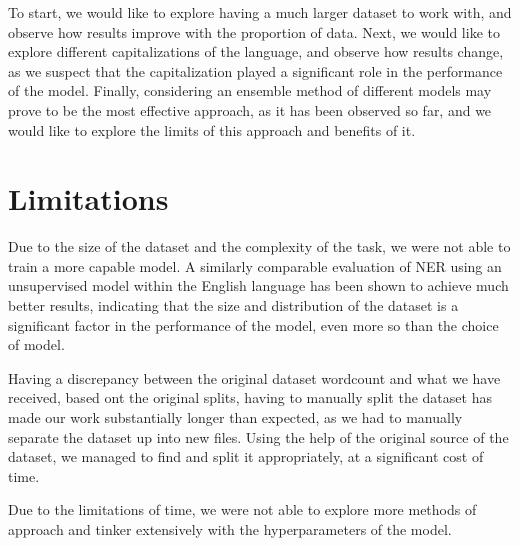 \documentclass[11pt]{article}
\begin{document}
To start, we would like to explore having a much larger dataset to work with, and observe how results improve with the proportion of data.
Next, we would like to explore different capitalizations of the language, and observe how results change, as we
suspect that the capitalization played a significant role in the performance of the model.
Finally, considering an ensemble method of different models may prove to be the most effective approach, as it has been observed so far,
and we would like to explore the limits of this approach and benefits of it.

\section*{Limitations}

Due to the size of the dataset and the complexity of the task, we were not able to train a more capable model.
A similarly comparable evaluation of NER using an unsupervised model within the English language has been shown to achieve much better results,
indicating that the size and distribution of the dataset is a significant factor in the performance of the model, even more so than the choice of model.

Having a discrepancy between the original dataset wordcount and what we have received, based ont the original splits, having to
manually split the dataset has made our work substantially longer than expected, as we had to manually separate the dataset up into
new files. Using the help of the original source of the dataset, we managed to find and split it appropriately, at a significant cost of time.

Due to the limitations of time, we were not able to explore more methods of approach and tinker extensively with the hyperparameters of the model.


\end{document}
